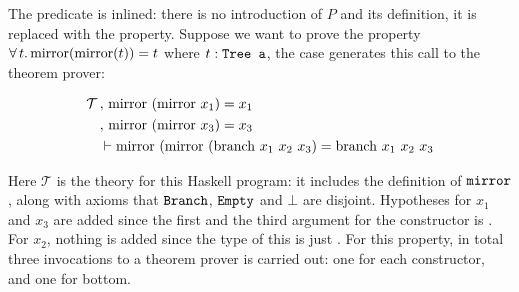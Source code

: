 The predicate is inlined: there is no introduction of $P$ and its
definition, it is replaced with the property. Suppose we want to prove
the property
$\forall \, t . \, \mathrm{mirror}(\mathrm{mirror}(t)) = t$ where $t : \texttt{Tree a}$,
the  case generates this call to the theorem prover:

\begin{align*}
\mathcal{T} \, & , \, \mathrm{mirror} \,\, (\mathrm{mirror} \,\, x_1) = x_1 \\
            \, & , \, \mathrm{mirror} \,\, (\mathrm{mirror} \,\, x_3) = x_3 \\
               &\vdash \mathrm{mirror} \,\, (\mathrm{mirror} \,\, (\mathrm{branch} \,\, x_1 \,\, x_2\,\, x_3) = \mathrm{branch} \,\, x_1 \,\, x_2\,\, x_3
\end{align*}

Here $\mathcal{T}$ is the theory for this Haskell program: it includes
the definition of $\texttt{mirror}$, along with axioms that $\texttt{Branch}$,
$\texttt{Empty}$ and $\bot$ are disjoint.  Hypotheses for $x_1$ and $x_3$
are added since the first and the third argument for the 
constructor is . For $x_2$, nothing is added since the type
of this is just .  For this property, in total three invocations
to a theorem prover is carried out: one for each constructor, and one
for bottom.

\begin{comment}
    \note{I don't elaborate on this too much since the current
      implementation generates tree of a given depth instead of a given
      number of constructors. Specifying constructors could potentially
      give you less granularity: I need to investigate this}
    To generate theories for the approach in \ref{sec:genind} an algorithm
    was written to generate trees with a number of constructors. For the
    commutativity of plus example, you would start with the expression
    \hs{(x :: Nat,y :: Nat)}, and for each occurrence of a typed variable,
    you replace it with its constructors, and combine. Then an other
    algorithm takes a typed expression, like
    \hs{(Succ (x :: Nat),Succ (y :: Nat))} and returns all expressions
    with less constructors you can generate with the correct type with
    the typed variables, here \hs{(Nat,Nat)}. Then you proceed as in the
    simple case: one invocation to the theorem prover for each step,
    variables are skolemised and the predicate inlined.

    This leads to a combinatorial explosion for a lot of data types. If
    you need to prove something with length $n$ lists, you get a induction
    conclusion $P(x_1\hs{:}x_2\hs{:}\cdots\hs{:}x_n\hs{:}xs)}$, and as there
    are $n!$ combinations of $x_1 \cdots x_n$, making this approach
    unusable for high $n$. A better way would probably to just give you
    all sub trees instead of all possible trees: again, this of course
    depends on what you need to show.
\end{comment}

